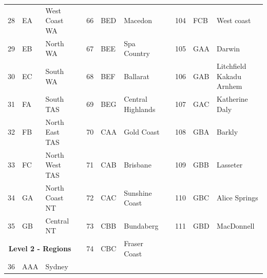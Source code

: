 \documentclass[12pt]{article}
\theoremstyle{definition}
\begin{document}
\begin{table}[!hb]
{\begin{tabular}{lllllllllll}
			28	& EA & West Coast WA 	& &  66  & BED & Macedon    &&104 & FCB& West coast\\
			29	& EB & North WA			& &  67  & BEE & Spa Country   &&105 & GAA& Darwin \\
			30	& EC & South WA 		& &   68  & BEF & Ballarat     &&106 & GAB& Litchfield Kakadu Arnhem\\
			31	& FA & South TAS		& &  69  & BEG & Central Highlands  &&107 & GAC& Katherine Daly\\
			32	& FB & North East TAS	& & 70  & CAA & Gold Coast  &&108 & GBA& Barkly\\
			33	& FC & North West TAS	& & 71  & CAB & Brisbane  &&109 & GBB& Lasseter\\
			34	& GA & North Coast NT	& & 72  & CAC & Sunshine Coast &&110 & GBC& Alice Springs\\
			35	& GB & Central NT		& &  73  & CBB & Bundaberg      &&111 & GBD& MacDonnell\\
			\cmidrule(lr){1-3}
			\multicolumn{3}{c}{\textbf{Level 2 - Regions}} & & 74  & CBC & Fraser Coast    &&\\
			\cmidrule(lr){1-3}
			36	& AAA & Sydney 			& 	&  &&\\
			
			\bottomrule
		\end{tabular}
	}
\end{table}




\end{document}
